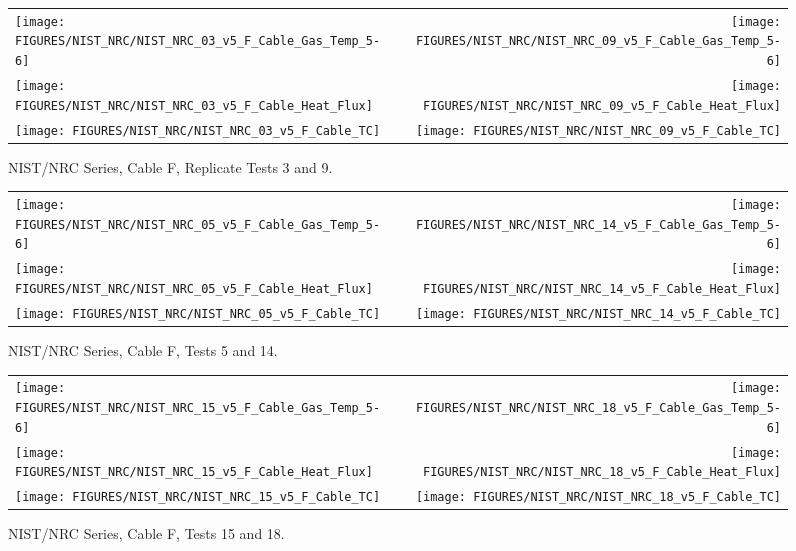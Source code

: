 \begin{figure}[h]
\begin{tabular*}{\textwidth}{l@{\extracolsep{\fill}}r}
\texttt{[image: FIGURES/NIST\_NRC/NIST\_NRC\_03\_v5\_F\_Cable\_Gas\_Temp\_5-6]} &
\texttt{[image: FIGURES/NIST\_NRC/NIST\_NRC\_09\_v5\_F\_Cable\_Gas\_Temp\_5-6]} \\
\texttt{[image: FIGURES/NIST\_NRC/NIST\_NRC\_03\_v5\_F\_Cable\_Heat\_Flux]} &
\texttt{[image: FIGURES/NIST\_NRC/NIST\_NRC\_09\_v5\_F\_Cable\_Heat\_Flux]} \\
\texttt{[image: FIGURES/NIST\_NRC/NIST\_NRC\_03\_v5\_F\_Cable\_TC]} &
\texttt{[image: FIGURES/NIST\_NRC/NIST\_NRC\_09\_v5\_F\_Cable\_TC]}
\end{tabular*}
\caption{NIST/NRC Series, Cable F, Replicate Tests 3 and 9.}
\label{NIST_NRC_F_3_and_9}
\end{figure}

\begin{figure}[h]
\begin{tabular*}{\textwidth}{l@{\extracolsep{\fill}}r}
\texttt{[image: FIGURES/NIST\_NRC/NIST\_NRC\_05\_v5\_F\_Cable\_Gas\_Temp\_5-6]} &
\texttt{[image: FIGURES/NIST\_NRC/NIST\_NRC\_14\_v5\_F\_Cable\_Gas\_Temp\_5-6]} \\
\texttt{[image: FIGURES/NIST\_NRC/NIST\_NRC\_05\_v5\_F\_Cable\_Heat\_Flux]} &
\texttt{[image: FIGURES/NIST\_NRC/NIST\_NRC\_14\_v5\_F\_Cable\_Heat\_Flux]} \\
\texttt{[image: FIGURES/NIST\_NRC/NIST\_NRC\_05\_v5\_F\_Cable\_TC]} &
\texttt{[image: FIGURES/NIST\_NRC/NIST\_NRC\_14\_v5\_F\_Cable\_TC]}
\end{tabular*}
\caption{NIST/NRC Series, Cable F, Tests 5 and 14.}
\label{NIST_NRC_F_5_and_14}
\end{figure}

\begin{figure}[h]
\begin{tabular*}{\textwidth}{l@{\extracolsep{\fill}}r}
\texttt{[image: FIGURES/NIST\_NRC/NIST\_NRC\_15\_v5\_F\_Cable\_Gas\_Temp\_5-6]} &
\texttt{[image: FIGURES/NIST\_NRC/NIST\_NRC\_18\_v5\_F\_Cable\_Gas\_Temp\_5-6]} \\
\texttt{[image: FIGURES/NIST\_NRC/NIST\_NRC\_15\_v5\_F\_Cable\_Heat\_Flux]} &
\texttt{[image: FIGURES/NIST\_NRC/NIST\_NRC\_18\_v5\_F\_Cable\_Heat\_Flux]} \\
\texttt{[image: FIGURES/NIST\_NRC/NIST\_NRC\_15\_v5\_F\_Cable\_TC]} &
\texttt{[image: FIGURES/NIST\_NRC/NIST\_NRC\_18\_v5\_F\_Cable\_TC]}
\end{tabular*}
\caption{NIST/NRC Series, Cable F, Tests 15 and 18.}
\label{NIST_NRC_F_15_and_18}
\end{figure}


